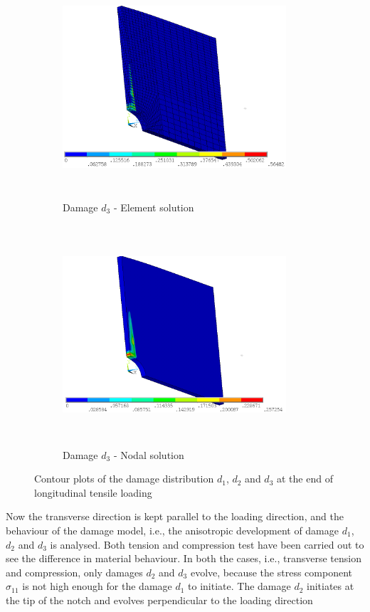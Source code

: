 \documentclass[12pt]{report}
\begin{document}
\begin{figure}[htbp!]\ContinuedFloat     
     \begin{subfigure}[b]{0.4\textwidth}
         \includegraphics[width=8.3cm,height=8.2cm,keepaspectratio]{27.d3-lt-e.png}
         \caption{Damage $d_{3}$ - Element solution}
         \label{fig:d3-lt-e}
     \end{subfigure}
     \hspace{1.8cm}
     \begin{subfigure}[b]{0.4\textwidth}
         \includegraphics[width=8.3cm,height=8.2cm,keepaspectratio]{27.d3-lt-n.png}
         \caption{Damage $d_{3}$ - Nodal solution}
         \label{fig:d3-lt-n}
     \end{subfigure}
        \caption{Contour plots of the damage distribution $d_{1}$, $d_{2}$ and $d_{3}$ at the end of longitudinal tensile loading }
        \label{fig:Contour plots of the damage d1,d2,d3}     
\end{figure}
\FloatBarrier
\indent\indent\indent Now the transverse direction is kept parallel to the loading direction, and the behaviour of the damage model, i.e., the anisotropic development of damage  $d_{1}$, $d_{2}$ and $d_{3}$ is analysed. Both tension and compression test have been carried out to see the difference in material behaviour. In both the cases, i.e., transverse tension and compression, only damages $d_{2}$ and $d_{3}$ evolve, because the stress component $\sigma_{11}$ is not high enough for the damage $d_{1}$ to initiate. The damage $d_{2}$ initiates at the tip of the notch and evolves perpendicular to the loading direction 
\end{document}
